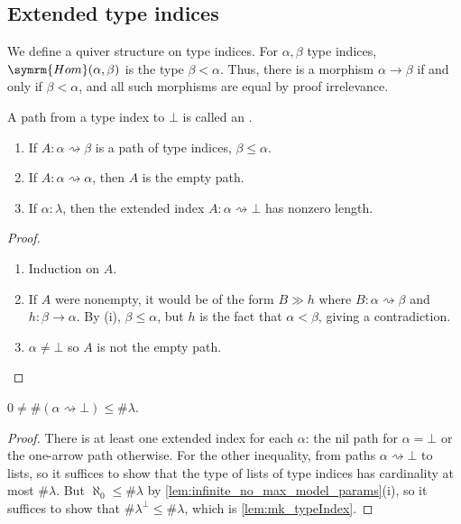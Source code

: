 \subsection{Extended type indices}

\begin{definition}
    We define a quiver structure on type indices.
    For \( \alpha, \beta \) type indices, \( \symrm{Hom}(\alpha, \beta) \) is the type \( \beta < \alpha \).
    Thus, there is a morphism \( \alpha \to \beta \) if and only if \( \beta < \alpha \), and all such morphisms are equal by proof irrelevance.
\end{definition}
\begin{definition}
    A path from a type index to \( \bot \) is called an .
\end{definition}
\begin{lemma}
    \label{lem:path_props}
    \begin{enumerate}
        \item If \( A : \alpha \rightsquigarrow \beta \) is a path of type indices, \( \beta \leq \alpha \).
        \item If \( A : \alpha \rightsquigarrow \alpha \), then \( A \) is the empty path.
        \item If \( \alpha : \lambda \), then the extended index \( A : \alpha \rightsquigarrow \bot \) has nonzero length.
    \end{enumerate}
\end{lemma}
\begin{proof}
    \begin{enumerate}
        \item Induction on \( A \).
        \item If \( A \) were nonempty, it would be of the form \( B \gg h \) where \( B : \alpha \rightsquigarrow \beta \) and \( h : \beta \to \alpha \).
        By (i), \( \beta \leq \alpha \), but \( h \) is the fact that \( \alpha < \beta \), giving a contradiction.
        \item \( \alpha \neq \bot \) so \( A \) is not the empty path.
    \end{enumerate}
\end{proof}
\begin{lemma}
    \label{lem:mk_extendedIndex}
    \( 0 \neq \#(\alpha \rightsquigarrow \bot) \leq \#\lambda \).
\end{lemma}
\begin{proof}
    There is at least one extended index for each \( \alpha \): the nil path for \( \alpha = \bot \) or the one-arrow path otherwise.
    For the other inequality,  from paths \( \alpha \rightsquigarrow \bot \) to lists, so it suffices to show that the type of lists of type indices has cardinality at most \( \#\lambda \).
    But \( \aleph_0 \leq \#\lambda \) by \ref{lem:infinite_no_max_model_params}(i), so it suffices to show that \( \#\lambda^\bot \leq \#\lambda \), which is \ref{lem:mk_typeIndex}.
\end{proof}
